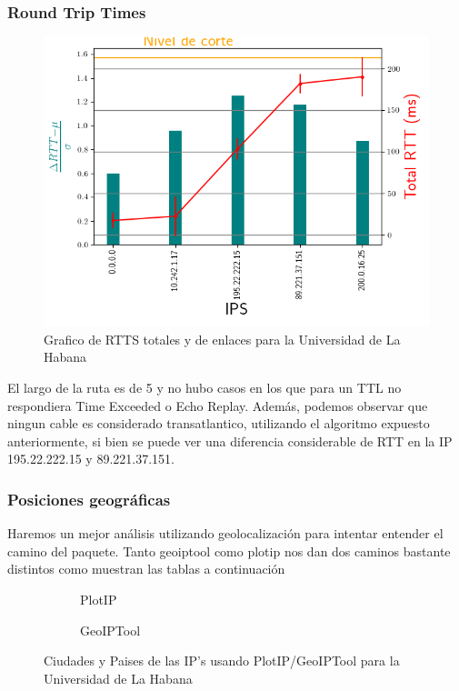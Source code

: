 \subsubsection{Round Trip Times}

\begin{figure}[ht]
	\begin{center}
		\includegraphics[width=0.8\columnwidth]{imagenes/rtts_habana.png}
		\caption{Grafico de RTTS totales y de enlaces para la Universidad de La Habana}
	\end{center}
\end{figure}

El largo de la ruta es de 5 y no hubo casos en los que para un TTL no respondiera
Time Exceeded o Echo Replay. Adem\'as, podemos observar que ningun cable es considerado
transatlantico, utilizando el algoritmo expuesto anteriormente, si bien se
puede ver una diferencia considerable de RTT en la IP 195.22.222.15 y
89.221.37.151.  \\

\subsubsection{Posiciones geográficas}

Haremos un mejor an\'alisis utilizando geolocalizaci\'on para intentar entender
el camino del paquete. Tanto geoiptool como plotip nos dan dos caminos bastante
distintos como muestran las tablas a continuaci\'on

\begin{figure}[ht]
	\begin{subfigure}[b]{0.5\textwidth}
		\centering
		
		\caption{PlotIP}
	\end{subfigure}
	\begin{subfigure}[b]{0.5\textwidth}
		\centering
		
		\caption{GeoIPTool}
	\end{subfigure}
	\caption{Ciudades y Paises de las IP's usando PlotIP/GeoIPTool para la Universidad de La Habana}
\end{figure}


